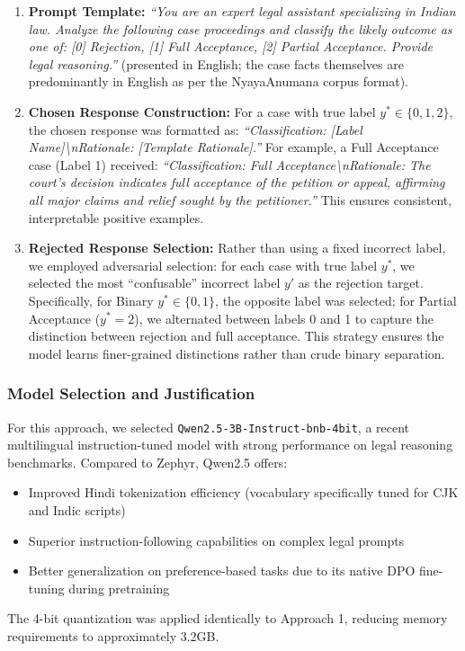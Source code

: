 \documentclass[conference]{IEEEtran}
\begin{document}
\begin{enumerate}
    \item \textbf{Prompt Template:} \textit{``You are an expert legal assistant specializing in Indian law. Analyze the following case proceedings and classify the likely outcome as one of: [0] Rejection, [1] Full Acceptance, [2] Partial Acceptance. Provide legal reasoning.''} (presented in English; the case facts themselves are predominantly in English as per the NyayaAnumana corpus format).
    \item \textbf{Chosen Response Construction:} For a case with true label $y^* \in \{0, 1, 2\}$, the chosen response was formatted as: \textit{``Classification: [Label Name]\textbackslash nRationale: [Template Rationale].''}  For example, a Full Acceptance case (Label 1) received: \textit{``Classification: Full Acceptance\textbackslash nRationale: The court's decision indicates full acceptance of the petition or appeal, affirming all major claims and relief sought by the petitioner.''} This ensures consistent, interpretable positive examples.
    \item \textbf{Rejected Response Selection:} Rather than using a fixed incorrect label, we employed adversarial selection: for each case with true label $y^*$, we selected the most ``confusable'' incorrect label $y'$ as the rejection target. Specifically, for Binary $y^* \in \{0,1\}$, the opposite label was selected; for Partial Acceptance ($y^* = 2$), we alternated between labels 0 and 1 to capture the distinction between rejection and full acceptance. This strategy ensures the model learns finer-grained distinctions rather than crude binary separation.
\end{enumerate}

\subsubsection{Model Selection and Justification}
For this approach, we selected \texttt{Qwen2.5-3B-Instruct-bnb-4bit}, a recent multilingual instruction-tuned model with strong performance on legal reasoning benchmarks. Compared to Zephyr, Qwen2.5 offers:
\begin{itemize}
    \item Improved Hindi tokenization efficiency (vocabulary specifically tuned for CJK and Indic scripts)
    \item Superior instruction-following capabilities on complex legal prompts
    \item Better generalization on preference-based tasks due to its native DPO fine-tuning during pretraining
\end{itemize}
The 4-bit quantization was applied identically to Approach 1, reducing memory requirements to approximately 3.2GB.
\end{document}
